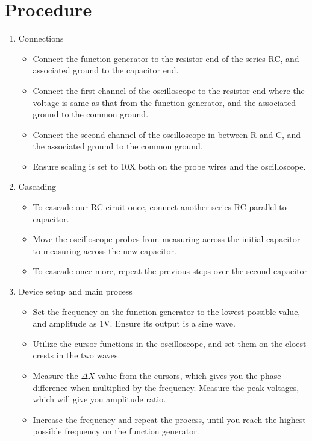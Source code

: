 \documentclass[a4paper,12pt]{article}
\begin{document}
\section{Procedure}
\begin{enumerate}
  \item Connections
    \begin{itemize}
      \item Connect the function generator to the resistor end of the series RC, and associated ground to the capacitor end.
      \item Connect the first channel of the oscilloscope to the resistor end where the voltage is same as that from the function generator, and the associated ground to the common ground.
      \item Connect the second channel of the oscilloscope in between R and C, and the associated ground to the common ground.
      \item Ensure scaling is set to 10X both on the probe wires and the oscilloscope.
    \end{itemize}
  \item Cascading
    \begin{itemize}
      \item To cascade our RC ciruit once, connect another series-RC parallel to capacitor. 
      \item Move the oscilloscope probes from measuring across the initial capacitor to measuring across the new capacitor. 
      \item To cascade once more, repeat the previous steps over the second capacitor 
    \end{itemize}
  \item Device setup and main process
    \begin{itemize}
      \item Set the frequency on the function generator to the lowest possible value, and amplitude as $1$V. Ensure its output is a sine wave.
      \item Utilize the cursor functions in the oscilloscope, and set them on the cloest crests in the two waves. 
      \item Measure the $\Delta X$ value from the cursors, which gives you the phase difference when multiplied by the frequency. Measure the peak voltages, which will give you amplitude ratio. 
      \item Increase the frequency and repeat the process, until you reach the highest possible frequency on the function generator. 
    \end{itemize}

\end{enumerate}
\end{document}
